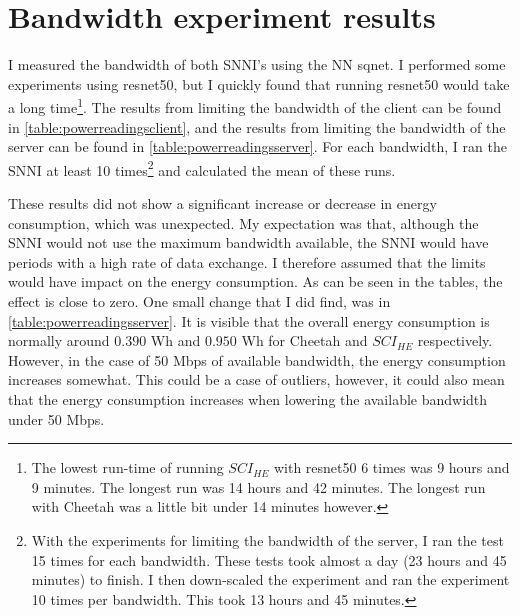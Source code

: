 \documentclass[../thesis.tex]{subfiles}
\begin{document}
\section{Bandwidth experiment results}

\begin{figure}[hbt]
    \begin{floatrow}
        }{
            \caption{Average run-time for both Cheetah and $SCI_{HE}$.}
            \label{fig:graph_times_mean}
        }
        \ffigbox[0.5\textwidth]{\texttt{[image: \{Thesis/Images/graph\_times\_avg.png]}}}{
            \caption{Median run-time for both Cheetah and $SCI_{HE}$.}
            \label{fig:graph_times_median}
        }
    \end{floatrow}
\end{figure}
I measured the bandwidth of both SNNI's using the NN sqnet. I performed some experiments using resnet50, but I quickly found that running resnet50 would take a long time\footnote{The lowest run-time of running $SCI_{HE}$ with resnet50 6 times was 9 hours and 9 minutes. The longest run was 14 hours and 42 minutes. The longest run with Cheetah was a little bit under 14 minutes however.}. The results from limiting the bandwidth of the client can be found in \autoref{table:powerreadingsclient}, and the results from limiting the bandwidth of the server can be found in \autoref{table:powerreadingsserver}. For each bandwidth, I ran the SNNI at least 10 times\footnote{With the experiments for limiting the bandwidth of the server, I ran the test 15 times for each bandwidth. These tests took almost a day (23 hours and 45 minutes) to finish. I then down-scaled the experiment and ran the experiment 10 times per bandwidth. This took 13 hours and 45 minutes.} and calculated the mean of these runs. 

These results did not show a significant increase or decrease in energy consumption, which was unexpected. My expectation was that, although the SNNI would not use the maximum bandwidth available, the SNNI would have periods with a high rate of data exchange. I therefore assumed that the limits would have impact on the energy consumption. As can be seen in the tables, the effect is close to zero. One small change that I did find, was in \autoref{table:powerreadingsserver}. It is visible that the overall energy consumption is normally around $0.390$ Wh and $0.950$ Wh for Cheetah and $SCI_{HE}$ respectively. However, in the case of 50 Mbps of available bandwidth, the energy consumption increases somewhat. This could be a case of outliers, however, it could also mean that the energy consumption increases when lowering the available bandwidth under 50 Mbps. 
\end{document}
